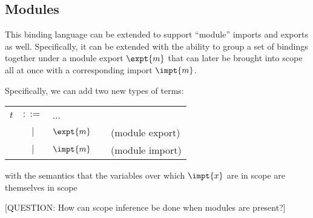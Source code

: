 \documentclass[preprint]{sigplanconf}
\makeatletter
\newenvironment{jtable}
  {\begin{center}\begin{tabular}{l c l @{\quad}l l}}
  {\end{tabular}\end{center}}
\theoremstyle{plain}
\makeatother
\begin{document}
\subsection{Modules}

This binding language can be extended to support ``module'' imports
and exports as well. Specifically, it can be extended with the ability
to group a set of bindings together under a module export $\expt{m}$
that can later be brought into scope all at once with a corresponding
import $\impt{m}$.


Specifically, we can add two new types of terms:
\begin{jtable}
$t$ &$::=$& ... \\
 &$\mid$& $\expt{m}$ && (module export)\\
 &$\mid$& $\impt{m}$ && (module import)\\
\end{jtable}
with the semantics that the variables over which $\impt{x}$ are in
scope are themselves in scope

[QUESTION: How can scope inference be done when modules are present?]
\end{document}
